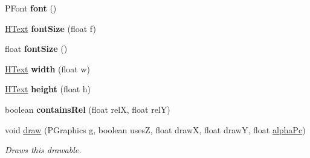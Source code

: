 \begin{DoxyCompactItemize}
\item 
\hypertarget{classhype_1_1extended_1_1drawable_1_1_h_text_ab8cb9c7ccd23080ffb61c04eef69736b}{P\-Font {\bfseries font} ()}\label{classhype_1_1extended_1_1drawable_1_1_h_text_ab8cb9c7ccd23080ffb61c04eef69736b}

\item 
\hypertarget{classhype_1_1extended_1_1drawable_1_1_h_text_addd6db9160f2a16a48ec2c98d7df909c}{\hyperlink{classhype_1_1extended_1_1drawable_1_1_h_text}{H\-Text} {\bfseries font\-Size} (float f)}\label{classhype_1_1extended_1_1drawable_1_1_h_text_addd6db9160f2a16a48ec2c98d7df909c}

\item 
\hypertarget{classhype_1_1extended_1_1drawable_1_1_h_text_a0724526739ec54a7634bb575ce2345d2}{float {\bfseries font\-Size} ()}\label{classhype_1_1extended_1_1drawable_1_1_h_text_a0724526739ec54a7634bb575ce2345d2}

\item 
\hypertarget{classhype_1_1extended_1_1drawable_1_1_h_text_a7013b6d524715ca3655adc3ff14ecc31}{\hyperlink{classhype_1_1extended_1_1drawable_1_1_h_text}{H\-Text} {\bfseries width} (float w)}\label{classhype_1_1extended_1_1drawable_1_1_h_text_a7013b6d524715ca3655adc3ff14ecc31}

\item 
\hypertarget{classhype_1_1extended_1_1drawable_1_1_h_text_a3746dbc04cb348b235ab70d653e1d41d}{\hyperlink{classhype_1_1extended_1_1drawable_1_1_h_text}{H\-Text} {\bfseries height} (float h)}\label{classhype_1_1extended_1_1drawable_1_1_h_text_a3746dbc04cb348b235ab70d653e1d41d}

\item 
\hypertarget{classhype_1_1extended_1_1drawable_1_1_h_text_a302d7a125313b353a536817dcc906e88}{boolean {\bfseries contains\-Rel} (float rel\-X, float rel\-Y)}\label{classhype_1_1extended_1_1drawable_1_1_h_text_a302d7a125313b353a536817dcc906e88}

\item 
void \hyperlink{classhype_1_1extended_1_1drawable_1_1_h_text_acff0face36490c9482ad0c536a9612d3}{draw} (P\-Graphics g, boolean uses\-Z, float draw\-X, float draw\-Y, float \hyperlink{classhype_1_1core_1_1drawable_1_1_h_drawable_ad4f0e4c9f93d810c66b39f1715625719}{alpha\-Pc})
\begin{DoxyCompactList}\small\item\em Draws this drawable. \end{DoxyCompactList}\end{DoxyCompactItemize}
